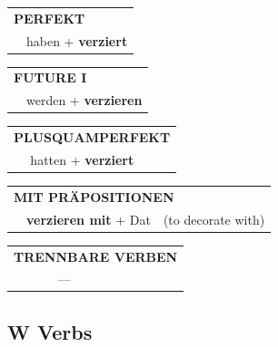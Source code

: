 \documentclass[10pt,a4paper]{revtex4-2}
\begin{document}
\begin{verbbox-acc}
\vspace{10pt}

\begin{tabular}{rl}
\multicolumn{2}{l}{\textbf{PERFEKT}}\\
& haben + \textbf{verziert}\\
\end{tabular}
\hfill
\begin{tabular}{rl}
\multicolumn{2}{l}{\textbf{FUTURE I}}\\
& werden + \textbf{verzieren}\\
\end{tabular}
\hfill
\begin{tabular}{rl}
\multicolumn{2}{l}{\textbf{PLUSQUAMPERFEKT}}\\
& hatten + \textbf{verziert}\\
\end{tabular}

\vspace{10pt}

\begin{tabular}{lll}
\multicolumn{3}{l}{\textbf{MIT PRÄPOSITIONEN}}\\
& \textbf{verzieren mit} + Dat & (to decorate with)\\
\end{tabular}
\hfill
\begin{tabular}{lll}
\multicolumn{3}{l}{\textbf{TRENNBARE VERBEN}}\\
& ---\\
\end{tabular}

\vspace{-5pt}
\end{verbbox-acc}

\subsection{W Verbs}
\end{document}
